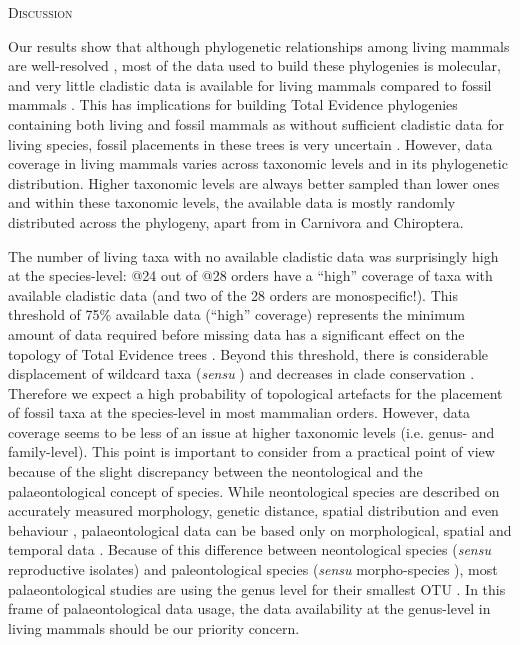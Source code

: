 \documentclass[12pt,letterpaper]{article}
\renewcommand{\section}[1]{%
\bigskip
\begin{center}
\begin{Large}
\normalfont\scshape #1
\medskip
\end{Large}
\end{center}}
\begin{document}
\section{Discussion}
Our results show that although phylogenetic relationships among living mammals are well-resolved \citep[e.g.][]{FritzTree,meredithimpacts2011,May-Collado-PeerJ}, most of the data used to build these phylogenies is molecular, and very little cladistic data is available for living mammals compared to fossil mammals \citep[e.g.][]{O'Leary08022013,ni2013oldest}.
This has implications for building Total Evidence phylogenies containing both living and fossil mammals as without sufficient cladistic data for living species, fossil placements in these trees is very uncertain \citep{GuillermeCooper}.
However, data coverage in living mammals varies across taxonomic levels and in its phylogenetic distribution.
Higher taxonomic levels are always better sampled than lower ones and within these taxonomic levels, the available data is mostly randomly distributed across the phylogeny, apart from in Carnivora and Chiroptera.

The number of living taxa with no available cladistic data was surprisingly high at the species-level: @24 out of @28 orders have a ``high'' coverage of taxa with available cladistic data (and two of the 28 orders are monospecific!).
This threshold of 75\% available data (``high'' coverage) represents the minimum amount of data required before missing data has a significant effect on the topology of Total Evidence trees \citep{GuillermeCooper}.
Beyond this threshold, there is considerable displacement of wildcard taxa (\textit{sensu} \citep{kearneyfragmentary2002}) and decreases in clade conservation \citep{GuillermeCooper}.
Therefore we expect a high probability of topological artefacts for the placement of fossil taxa at the species-level in most mammalian orders.
However, data coverage seems to be less of an issue at higher taxonomic levels (i.e. genus- and family-level).
This point is important to consider from a practical point of view because of the slight discrepancy between the neontological and the palaeontological concept of species.
While neontological species are described on accurately measured morphology, genetic distance, spatial distribution and even behaviour \citep[e.g.][]{kellymolecular2014}, palaeontological data can be based only on morphological, spatial and temporal data \citep[e.g.][]{ni2013oldest}.
Because of this difference between neontological species (\textit{sensu} reproductive isolates) and paleontological species (\textit{sensu} morpho-species %
), most palaeontological studies are using the genus level for their smallest OTU \citep[e.g.][]{ni2013oldest,O'Leary08022013}.
In this frame of palaeontological data usage, the data availability at the genus-level in living mammals should be our priority concern.
\end{document}
